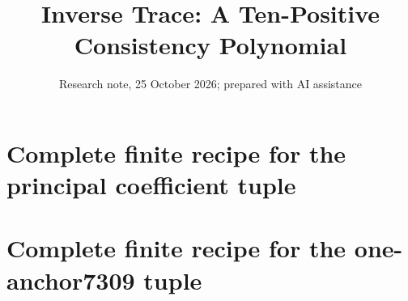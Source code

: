 \documentclass[10pt]{article}
\title{Inverse Trace: A Ten-Positive Consistency Polynomial}
\author{Research note, 25 October 2026; prepared with AI assistance}
\date{}
\begin{document}
\maketitle

\appendix
\section{Complete finite recipe for the principal coefficient tuple}

\section{Complete finite recipe for the one-anchor7309 tuple}

\end{document}
